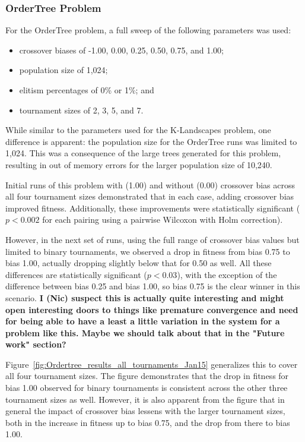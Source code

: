 \documentclass{sig-alternate}
\begin{document}
\subsubsection{OrderTree Problem}

For the OrderTree problem, a full sweep of the following parameters was used:

\begin{itemize}
	\item crossover biases of -1.00, 0.00, 0.25, 0.50, 0.75, and 1.00;
	\item population size of 1,024;
	\item elitism percentages of 0\% or 1\%; and
	\item tournament sizes of 2, 3, 5, and 7.
\end{itemize}

While similar to the parameters used for the K-Landscapes problem, one difference is apparent: the population size for
the OrderTree runs was limited to 1,024. This was a consequence of the large trees generated for this problem,
resulting in out of memory errors for the larger population size of 10,240.

Initial runs of this problem with (1.00) and without (0.00) crossover bias across all four tournament sizes
demonstrated that in each case, adding crossover bias improved fitness. Additionally, these improvements were
statistically significant ($p < 0.002$ for each pairing using a pairwise Wilcoxon with Holm correction).

However, in the next set of runs, using the full range of crossover bias values but limited to binary tournaments, we
observed a drop in fitness from bias 0.75 to bias 1.00, actually dropping slightly below that for 0.50 as well. All
these differences are statistically significant ($p < 0.03$), with the exception of the difference between bias 0.25
and bias 1.00, so bias 0.75 is the clear winner in this scenario. \textbf{I (Nic) suspect this is actually quite
interesting and might open interesting doors to things like premature convergence and need for being able to have a
least a little variation in the system for a problem like this. Maybe we should talk about that in the "Future work"
section?}

Figure~\ref{fig:Ordertree_results_all_tournaments_Jan15} generalizes this to cover all four tournament sizes. The
figure demonstrates that the drop in fitness for bias 1.00 observed for binary tournaments is consistent across the
other three tournament sizes as well. However, it is also apparent from the figure that in general the impact of
crossover bias lessens with the larger tournament sizes, both in the increase in fitness up to bias 0.75, and the drop
from there to bias 1.00.
\end{document}
